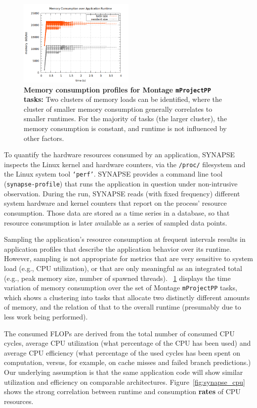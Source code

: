 \documentclass[preprint,12pt]{elsarticle}
\newcommand{\B}[1]{\textbf{#1}\xspace}
\newcommand{\T}[1]{\texttt{#1}\xspace}
\begin{document}
\begin{figure} \centering
  \includegraphics[width=0.5\textwidth]{experiments/synapse_montage/rs_synapse_2mass_m101_j_6_6_mprojectpp_mem}
  \caption { \footnotesize \B{Memory consumption profiles for Montage
      \T{mProjectPP} tasks:} Two clusters of memory loads can be identified,
    where the cluster of smaller memory consumption generally correlates to
    smaller runtimes.  For the majority of tasks (the larger cluster), the
    memory consumption is constant, and runtime is not influenced by other
    factors.
    \label{fig:synapse_mem_6_6} } \end{figure} To quantify the hardware
resources consumed by an application, SYNAPSE inspects the Linux kernel and
hardware counters, via the \T{/proc/} filesystem and the Linux system tool
\T{`perf'}.  SYNAPSE provides a command line tool (\T{synapse-profile}) that
runs the application in question under non-intrusive observation. During the
run, SYNAPSE reads (with fixed frequency) different system hardware and kernel
counters that report on the process' resource consumption.  Those data are
stored as a time series in a database, so that resource consumption is later
available as a series of sampled data points. 

Sampling the application's resource consumption at frequent intervals results in
application profiles that describe the application behavior over its runtime.
However, sampling is not appropriate for metrics that are very sensitive to
system load (e.g., CPU utilization), or that are only meaningful as an
integrated total (e.g., peak memory size, number of spawned threads).
\figurename~\ref{fig:synapse_mem_6_6} displays the time variation of memory
consumption over the set of Montage \T{mProjectPP} tasks, which shows a
clustering into tasks that allocate two distinctly different amounts of memory,
and the relation of that to the overall runtime (presumably due to less work
being performed).

The consumed FLOPs are derived from the total number of consumed CPU
cycles, average CPU utilization (what percentage of the CPU has been
used) and average CPU efficiency (what percentage of the used cycles
has been spent on computation, versus, for example, on cache misses
and failed branch predictions.) Our underlying assumption is that
the same application code will show similar utilization and efficiency
on comparable architectures.  Figure~\ref{fig:synapse_cpu} shows the
strong correlation between runtime and consumption \B{rates} of CPU
resources.
\end{document}

